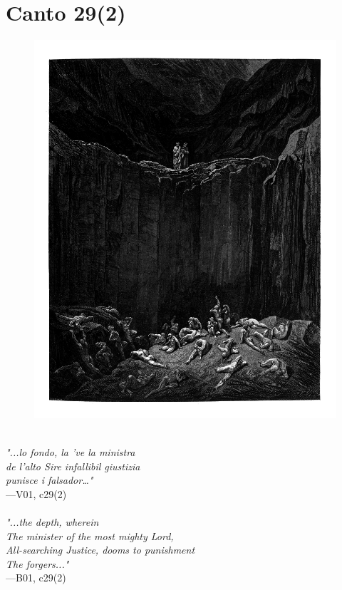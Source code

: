\documentclass[../Dore_vision.tex]{subfiles}
\begin{document}
\newpage

\section{Canto 29(2)}

\begin{figure}[ht]
\centering
\includegraphics[height=\figsize]{illustrations/book_1/V01, c29(2).jpg}
\end{figure}

\begin{center}
\begin{minipage}{0.8\linewidth}
\textit{\\
"...lo fondo, la ’ve la ministra\\de l’alto Sire infallibil giustizia\\punisce i falsador…"} \\
—V01, c29(2) \\~\\
\textit{"...the depth, wherein\\The minister of the most mighty Lord,\\All-searching Justice, dooms to punishment\\The forgers..."} \\
—B01, c29(2)
\end{minipage}
\end{center}
\end{document}

